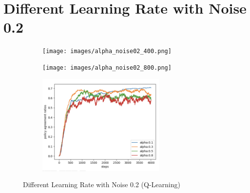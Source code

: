 \documentclass{article}
\begin{document}
\section{Different Learning Rate with Noise 0.2}
\begin{figure}[h]
	\begin{subfigure}{0.5\textwidth}
		\texttt{[image: images/alpha\_noise02\_400.png]} 
		\caption{}
	\end{subfigure}
	\begin{subfigure}{0.5\textwidth}
		\texttt{[image: images/alpha\_noise02\_800.png]}
		\caption{}
	\end{subfigure}
	\begin{subfigure}{0.5\textwidth}
		\includegraphics[width=0.9\linewidth, height=5cm]{images/alpha_noise02_4000.png}
		\caption{}
	\end{subfigure}
	\caption{Different Learning Rate with Noise 0.2 (Q-Learning)}
\end{figure}
\end{document}
